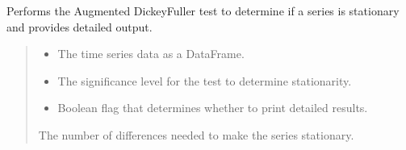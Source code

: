 \documentclass[letterpaper,10pt,english]{sphinxmanual}
\begin{document}
\begin{fulllineitems}
\label{\detokenize{docs/time_series_analysis:time_series_analysis.adf_test}}
\pysigstartsignatures
{}
\pysigstopsignatures
\sphinxAtStartPar
Performs the Augmented Dickey\sphinxhyphen{}Fuller test to determine if a series is stationary and provides detailed output.
\begin{quote}\begin{description}
\begin{itemize}
\item {} 
\sphinxAtStartPar
{} \textendash{} The time series data as a DataFrame.

\item {} 
\sphinxAtStartPar
{} \textendash{} The significance level for the test to determine stationarity.

\item {} 
\sphinxAtStartPar
{} \textendash{} Boolean flag that determines whether to print detailed results.

\end{itemize}

\sphinxAtStartPar
The number of differences needed to make the series stationary.

\end{description}\end{quote}

\end{fulllineitems}

\end{document}
